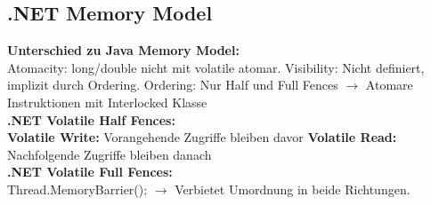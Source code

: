 \subsection{.NET Memory Model}
\textcolor{b}{\textbf{Unterschied zu Java Memory Model:}}\\
\textcolor{b}{Atomacity:} long/double nicht mit volatile atomar. \textcolor{b}{Visibility:} Nicht definiert, implizit durch Ordering. \textcolor{b}{Ordering:} Nur Half und Full Fences $\rightarrow$ Atomare Instruktionen mit \textcolor{b}{Interlocked} Klasse\\
\textcolor{b}{\textbf{.NET Volatile Half Fences:}}\\
\textbf{Volatile Write:} Vorangehende Zugriffe bleiben davor \textbf{Volatile Read:} Nachfolgende Zugriffe bleiben danach\\
\textcolor{b}{\textbf{.NET Volatile Full Fences:}}\\
Thread.MemoryBarrier(); $\rightarrow$ Verbietet Umordnung in beide Richtungen.